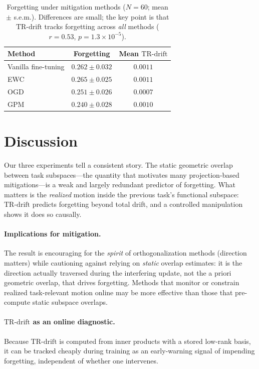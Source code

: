 \documentclass[11pt]{article}
\newcommand{\trdrift}{\mathrm{TR\text{-}drift}}
\begin{document}
\begin{table}[t]
\centering
\caption{Forgetting under mitigation methods ($N=60$; mean $\pm$ s.e.m.).
Differences are small; the key point is that $\trdrift$ tracks forgetting across
\emph{all} methods ($r=0.53$, $p=1.3\times10^{-5}$).}
\label{tab:baselines}
\begin{tabular}{lcc}
\toprule
Method & Forgetting & Mean $\trdrift$ \\
\midrule
Vanilla fine-tuning & $0.262 \pm 0.032$ & $0.0011$ \\
EWC                 & $0.265 \pm 0.025$ & $0.0011$ \\
OGD                 & $0.251 \pm 0.026$ & $0.0007$ \\
GPM                 & $0.240 \pm 0.028$ & $0.0010$ \\
\bottomrule
\end{tabular}
\end{table}

\section{Discussion}
\label{sec:discussion}

Our three experiments tell a consistent story. The static geometric overlap
between task subspaces---the quantity that motivates many projection-based
mitigations---is a weak and largely redundant predictor of forgetting. What
matters is the \emph{realized} motion inside the previous task's functional
subspace: $\trdrift$ predicts forgetting beyond total drift, and a controlled
manipulation shows it does so causally.

\paragraph{Implications for mitigation.}
The result is encouraging for the \emph{spirit} of orthogonalization methods
(direction matters) while cautioning against relying on \emph{static} overlap
estimates: it is the direction actually traversed during the interfering update,
not the a priori geometric overlap, that drives forgetting. Methods that monitor
or constrain realized task-relevant motion online may be more effective than
those that pre-compute static subspace overlaps.

\paragraph{$\trdrift$ as an online diagnostic.}
Because $\trdrift$ is computed from inner products with a stored low-rank basis,
it can be tracked cheaply during training as an early-warning signal of
impending forgetting, independent of whether one intervenes.
\end{document}
